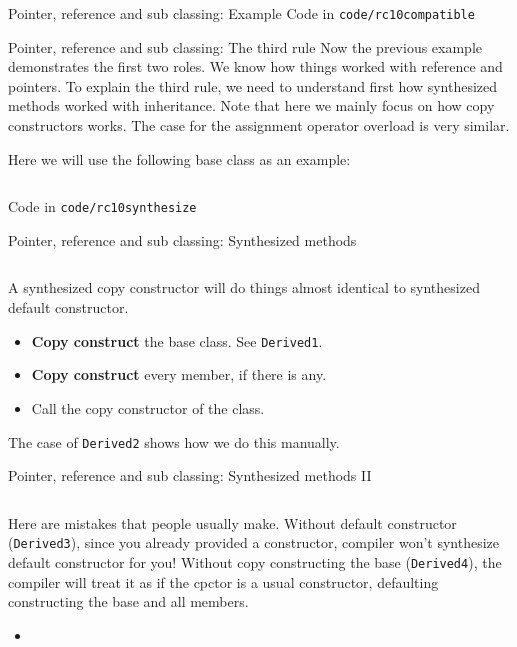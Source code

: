 \begin{frame}[fragile]{Pointer, reference and sub classing: Example}
Code in \texttt{code/rc10compatible}
\end{frame}

\begin{frame}{Pointer, reference and sub classing: The third rule}
Now the previous example demonstrates the first two roles. We know how things worked with reference and pointers. To explain the third rule, we need to understand first how synthesized methods worked with inheritance. Note that here we mainly focus on how copy constructors works. The case for the assignment operator overload is very similar.

Here we will use the following base class as an example:
\inputminted[fontsize=\small]{c++}{code/rc10synthesize/base.h}

Code in \texttt{code/rc10synthesize}
\end{frame}

\begin{frame}[fragile]{Pointer, reference and sub classing: Synthesized methods}
\vspace{-0.1in}
\inputminted[fontsize=\small]{c++}{code/rc10synthesize/ok.cpp}
A synthesized copy constructor will do things almost identical to synthesized default constructor. 
\begin{itemize}
	\item \textbf{Copy construct} the base class. See \texttt{Derived1}.
	\item \textbf{Copy construct} every member, if there is any. 
	\item Call the copy constructor of the class. 
\end{itemize}
The case of \texttt{Derived2} shows how we do this manually.
\end{frame}

\begin{frame}[fragile]{Pointer, reference and sub classing: Synthesized methods II}
\vspace{-0.1in}
\inputminted[fontsize=\small]{c++}{code/rc10synthesize/error.cpp}
Here are mistakes that people usually make. Without default constructor (\texttt{Derived3}), since you already provided a constructor, compiler won't synthesize default constructor for you! Without copy constructing the base (\texttt{Derived4}), the compiler will treat it as if the cpctor is a usual constructor, defaulting constructing the base and all members.
\begin{itemize}
	\item
\end{itemize}
\end{frame}

